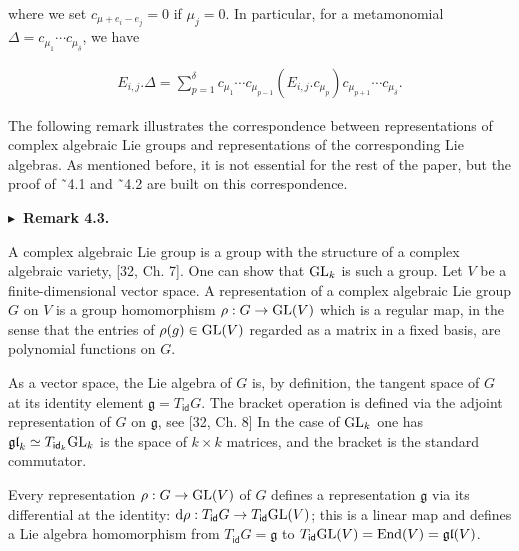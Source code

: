 \documentclass[10pt,a4paper]{article}
\begin{document}
where we set $c_{\mu+e_{i}-e_{j}}=0$ if $\mu_{j}=0$.
In particular, for a metamonomial $\Delta=c_{\mu_{1}}\cdots c_{\mu_{\delta}}$, we have



\[\begin{aligned}
E_{i,j}.\Delta=\textstyle\sum_{p=1}^{\delta}c_{\mu_{1}}\cdots c_{\mu_{p-1}}(E_{i,j}.c_{\mu_{p}})c_{\mu_{p+1}}\cdots c_{\mu_{\delta}}.
\end{aligned}\]





The following remark illustrates the correspondence between representations of complex algebraic Lie groups and representations of the corresponding Lie algebras. As mentioned before, it is not essential for the rest of the paper, but the proof of ˜4.1 and ˜4.2 are built on this correspondence.





\par\medskip\noindent\textbf{$\blacktriangleright$ Remark 4.3.}\par



A complex algebraic Lie group is a group with the structure of a complex algebraic variety, [32, Ch. 7]. One can show that $\textnormal{GL}_{k}$ is such a group. Let $V$ be a finite-dimensional vector space. A representation of a complex algebraic Lie group $G$ on $V$ is a group homomorphism $\rho:G\to\textnormal{GL}(V)$ which is a regular map, in the sense that the entries of $\rho(g)\in\textnormal{GL}(V)$ regarded as a matrix in a fixed basis, are polynomial functions on $G$.





As a vector space, the Lie algebra of $G$ is, by definition, the tangent space of $G$ at its identity element $\mathfrak{g}=T_{\mathsf{id}}G$. The bracket operation is defined via the adjoint representation of $G$ on $\mathfrak{g}$, see [32, Ch. 8] In the case of $\textnormal{GL}_{k}$ one has $\mathfrak{gl}_{k}\simeq T_{\mathsf{id}_{k}}\textnormal{GL}_{k}$ is the space of $k\times k$ matrices, and the bracket is the standard commutator.





Every representation $\rho:G\to\textnormal{GL}(V)$ of $G$ defines a representation $\mathfrak{g}$ via its differential at the identity: $\textnormal{d}\rho:T_{\mathsf{id}}G\to T_{\mathsf{id}}\textnormal{GL}(V)$; this is a linear map and defines a Lie algebra homomorphism from $T_{\mathsf{id}}G=\mathfrak{g}$ to $T_{\mathsf{id}}\textnormal{GL}(V)=\textnormal{End}(V)=\mathfrak{gl}(V)$.
\end{document}
